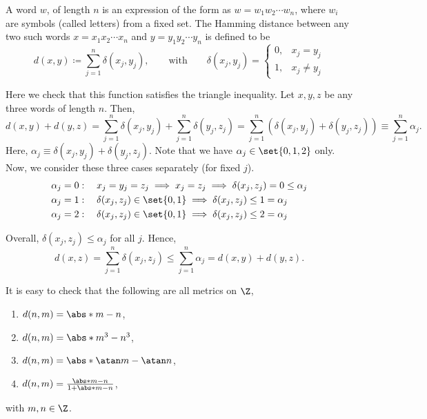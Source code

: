 \documentclass[draft]{penrose}
\begin{document}
\begin{negg}
  A word $w$, of length $n$ is an expression of the form as $w=w_1 w_2 \cdots w_n$, where $w_i$ are symbols (called letters) from a fixed set. The Hamming distance between any two such words $x=x_1 x_2 \cdots x_n$ and $y=y_1 y_2 \cdots y_n$ is defined to be
  \begin{equation*}
    d(x,y) \coloneqq \sum_{j=1}^{n} \delta(x_j, y_j),
    \qquad\text{with}\qquad
    \delta(x_j, y_j) = \begin{cases}
    0, & x_j = y_j\\
    1, & x_j \neq y_j
    \end{cases}
  \end{equation*}

  Here we check that this function satisfies the triangle inequality. Let $x,y,z$ be any three words of length $n$. Then,
  \begin{equation*}
    d(x,y) + d(y,z)
    = \sum_{j=1}^{n} \delta(x_j, y_j) + \sum_{j=1}^{n} \delta(y_j, z_j)
    = \sum_{j=1}^{n} \left(\delta(x_j, y_j) + \delta(y_j, z_j)\right)
    \equiv \sum_{j=1}^{n} \alpha_j.
  \end{equation*}
  Here, $\alpha_j \equiv \delta(x_j, y_j) + \delta(y_j, z_j)$. Note that we have $\alpha_j \in \set{0,1,2}$ only. Now, we consider these three cases separately (for fixed $j$).
  \begin{align*}
    \alpha_j &= 0:\quad x_j = y_j = z_j \implies x_j = z_j \implies \delta(x_j, z_j) = 0 \leq \alpha_j\\
    \alpha_j &= 1:\quad \delta(x_j, z_j) \in \set{0,1} \implies \delta(x_j, z_j) \leq 1 = \alpha_j\\
    \alpha_j &= 2:\quad \delta(x_j, z_j) \in \set{0,1} \implies \delta(x_j, z_j) \leq 2 = \alpha_j
  \end{align*}

  Overall, $\delta(x_j, z_j) \leq \alpha_j$ for all $j$. Hence,
  \begin{equation*}
    d(x,z) = \sum_{j=1}^{n} \delta(x_j, z_j) \leq \sum_{j=1}^{n} \alpha_j = d(x,y) + d(y,z).
  \end{equation*}
\end{negg}

\begin{negg}
  It is easy to check that the following are all metrics on $\Z$,
  \begin{enumerate}
  \item $d(n,m) = \abs*{m-n}$,
  \item $d(n,m) = \abs*{m^3 - n^3}$,
  \item $d(n,m) = \abs*{\atan m - \atan n}$,
  \item $d(n,m) = \frac{\abs*{m-n}}{1 + \abs*{m-n}}$,
  \end{enumerate}
  with $m,n \in \Z$.
\end{negg}
\end{document}
